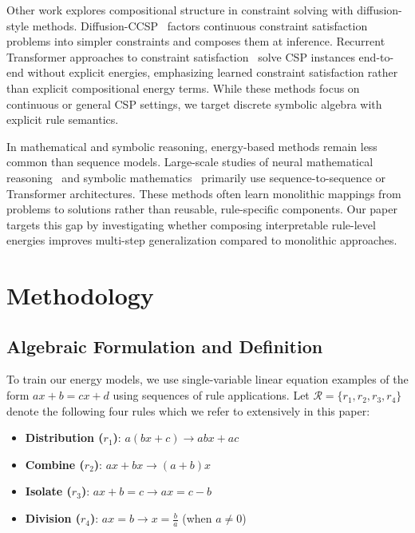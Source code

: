 \documentclass{article}
\begin{document}
Other work explores compositional structure in constraint solving with diffusion-style methods. Diffusion-CCSP~\citep{yang2023diffusion} factors continuous constraint satisfaction problems into simpler constraints and composes them at inference. Recurrent Transformer approaches to constraint satisfaction~\citep{yang2023recurrentcsp} solve CSP instances end-to-end without explicit energies, emphasizing learned constraint satisfaction rather than explicit compositional energy terms. While these methods focus on continuous or general CSP settings, we target discrete symbolic algebra with explicit rule semantics.

In mathematical and symbolic reasoning, energy-based methods remain less common than sequence models. Large-scale studies of neural mathematical reasoning~\citep{saxton2019math} and symbolic mathematics~\citep{lample2019symbolicmath} primarily use sequence-to-sequence or Transformer architectures. These methods often learn monolithic mappings from problems to solutions rather than reusable, rule-specific components. Our paper targets this gap by investigating whether composing interpretable rule-level energies improves multi-step generalization compared to monolithic approaches.


\section{Methodology}

\subsection{Algebraic Formulation and Definition}
\label{rules}

To train our energy models, we use single-variable linear equation examples of the form $ax + b = cx + d$ using sequences of rule applications. Let $\mathcal{R} = \{r_1, r_2, r_3, r_4\}$ denote the following four rules which we refer to extensively in this paper:
\begin{itemize}
    \item \textbf{Distribution ($r_1$)}: $a(bx + c) \rightarrow abx + ac$
    \item \textbf{Combine ($r_2$)}: $ax + bx \rightarrow (a+b)x$
    \item \textbf{Isolate ($r_3$)}: $ax + b = c \rightarrow ax = c - b$
    \item \textbf{Division ($r_4$)}: $ax = b \rightarrow x = \frac{b}{a}$ (when $a \neq 0$)
\end{itemize}
\end{document}
